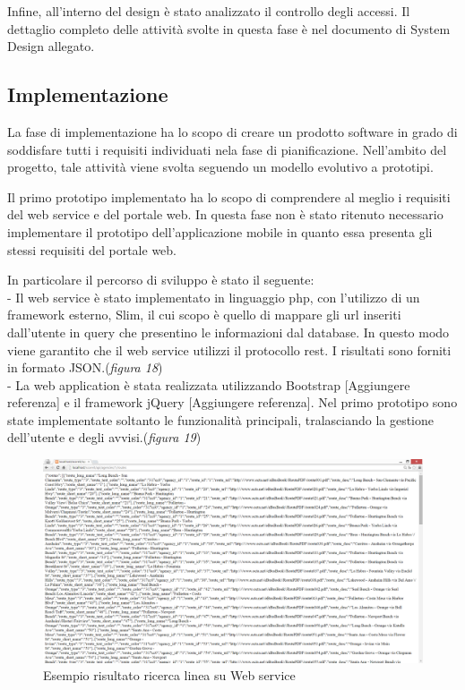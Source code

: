 Infine, all\rq interno del design \`{e} stato analizzato il controllo degli accessi. 
Il dettaglio completo delle attivit\`{a} svolte in questa fase \`{e} nel documento di System Design allegato.

\subsection{Implementazione}
La fase di implementazione ha lo scopo di creare un prodotto software in grado di soddisfare tutti i requisiti individuati nela fase di pianificazione. Nell'ambito del progetto, tale attivit\`{a} viene svolta seguendo un modello evolutivo a prototipi. 

Il primo prototipo implementato ha lo scopo di comprendere al meglio i requisiti del web service e del portale web. In questa fase non \`{e} stato ritenuto necessario implementare il prototipo dell\rq applicazione mobile in quanto essa presenta gli stessi requisiti del portale web. 

In particolare il percorso di sviluppo \`{e} stato il seguente:\\
- Il web service \`{e} stato implementato in linguaggio php, con l\rq utilizzo di un framework esterno, Slim, il cui scopo \`{e} quello di mappare gli url inseriti dall\rq utente in query che presentino le informazioni dal database. In questo modo viene garantito che il web service utilizzi il protocollo rest. I risultati sono forniti in formato JSON.(\emph{figura 18}) \\
- La web application \`{e} stata realizzata utilizzando Bootstrap [Aggiungere referenza] e il framework jQuery [Aggiungere referenza]. Nel primo prototipo sono state implementate soltanto le funzionalit\`{a} principali, tralasciando la gestione dell\rq utente e degli avvisi.(\emph{figura 19}) \\

\begin{figure}[tb]
\centering
\includegraphics[scale=.3]{img/19.png}
\caption{Esempio risultato ricerca linea su Web service }
\label{fig:mhs}
\end{figure} 

